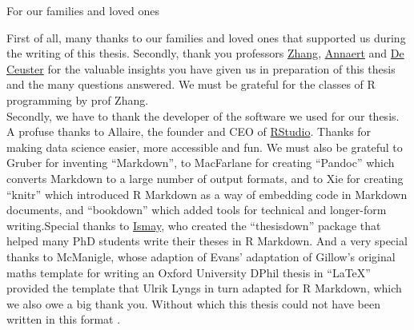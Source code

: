 \documentclass[a4paper, twoside]{templates/ociamthesis}
\begin{document}
\setcounter{secnumdepth}{2}
\setcounter{tocdepth}{2}



\begin{romanpages}

\maketitle

\begin{dedication}
  For our families and loved ones
\end{dedication}

\begin{acknowledgements}
 	First of all, many thanks to our families and loved ones that supported us during the writing of this thesis. Secondly, thank you professors \href{https://www.antwerpmanagementschool.be/nl/faculty/hairui-zhang}{Zhang}, \href{https://www.antwerpmanagementschool.be/nl/faculty/jan-annaert}{Annaert} and \href{https://www.antwerpmanagementschool.be/nl/faculty/marc-de-ceuster}{De Ceuster} for the valuable insights you have given us in preparation of this thesis and the many questions answered. We must be grateful for the classes of R programming by prof Zhang. ~\\

  \noindent Secondly, we have to thank the developer of the software we used for our thesis. A profuse thanks to Allaire, the founder and CEO of \href{http://rstudio.com}{RStudio}. Thanks for making data science easier, more accessible and fun. We must also be grateful to Gruber for inventing ``Markdown'', to MacFarlane for creating ``Pandoc'' which converts Markdown to a large number of output formats, and to Xie for creating ``knitr'' which introduced R Markdown as a way of embedding code in Markdown documents, and ``bookdown'' which added tools for technical and longer-form writing.Special thanks to \href{http://chester.rbind.io}{Ismay}, who created the ``thesisdown'' package that helped many PhD students write their theses in R Markdown. And a very special thanks to McManigle, whose adaption of Evans' adaptation of Gillow's original maths template for writing an Oxford University DPhil thesis in ``LaTeX'' provided the template that Ulrik Lyngs in turn adapted for R Markdown, which we also owe a big thank you. Without which this thesis could not have been written in this format \autocite{lyngsOxforddown2019}. ~\\


\end{acknowledgements}
\end{romanpages}
\end{document}
